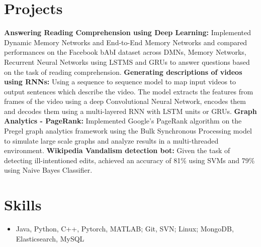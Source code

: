 \documentclass[letterpaper]{article}
\begin{document}
\section*{Projects}
\textbf{Answering Reading Comprehension using Deep Learning:}
Implemented Dynamic Memory Networks and End-to-End Memory Networks and compared performances on the Facebook bAbI dataset across DMNs, Memory Networks, Recurrent Neural Networks using LSTMS and GRUs  to answer questions based on the task of reading comprehension. 
\vspace{1mm} \newline
\textbf{Generating descriptions of videos using RNNs:}
Using a sequence to sequence model to map input videos to output sentences which describe the video. The model extracts the features from frames of the video using a deep Convolutional Neural Network, encodes them and decodes them using a multi-layered RNN with LSTM units or GRUs.
\vspace{1mm} \newline
\textbf{Graph Analytics - PageRank:} 
Implemented Google's PageRank algorithm on the Pregel graph analytics framework using the Bulk Synchronous Processing model to simulate large scale graphs and analyze results in a multi-threaded environment.
\vspace{1mm} \newline
\textbf{Wikipedia Vandalism detection bot:}
Given the task of detecting ill-intentioned edits, achieved an accuracy of 81\% using SVMs and 79\% using Naive Bayes Classifier.

\section*{Skills}
\begin{itemize}
\item Java, Python, C++, Pytorch, MATLAB; Git, SVN; Linux; MongoDB, Elasticsearch, MySQL
\end{itemize}
\end{document}
